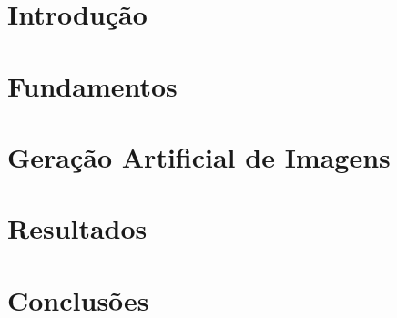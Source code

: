 \documentclass[mestrado, pre-defesa, english, brazil]{packages/icmc}
\begin{document}
\textual

\chapter{Introdução}
\label{chapter:introducao}


\chapter{Fundamentos}
\label{chapter:fundamentos}


\chapter{Geração Artificial de Imagens}
\label{chapter:metodo}


\chapter{Resultados}
\label{chapter:resultados}


\chapter{Conclusões}
\label{chapter:conclusões}


%

\postextual





\glsaddall
\printglossaries

\end{document}
